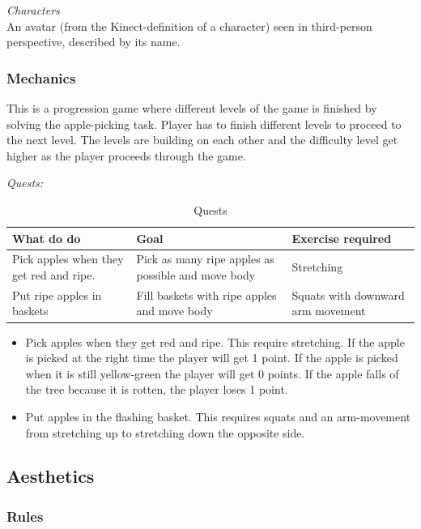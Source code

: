 \emph{Characters} \\
An avatar (from the Kinect-definition of a character) seen in third-person perspective, described by its name. 
 
\subsubsection{Mechanics} 
This is a progression game where different levels of the game is finished by solving the apple-picking task. Player has to finish different levels to proceed to the next level. The levels are building on each other and the difficulty level get higher as the player proceeds through the game.

\emph{Quests:} 

\begin{table}
     \begin{tabular}{|>{\raggedright}p{}|>{\raggedright}p{5cm}|p{}|}
       \hline
        \textbf{What do do} & \textbf{Goal} & \textbf{Exercise required}  \\ \hline
       Pick apples when they get red and ripe. & Pick as many ripe apples as possible and move body & Stretching  \\ \hline
       Put ripe apples in baskets & Fill baskets with ripe apples and move body &  Squats with downward arm movement \\ \hline
      \end{tabular}
      \caption[Quests in the "Apple Picking" game]{Quests}
    \label{tab:quests2}
 \end{table}

\begin{itemize}
\item Pick apples when they get red and ripe. This require stretching. If the apple is picked at the right time the player will get 1 point. If the apple is picked when it is still yellow-green the player will get 0 points. If the apple falls of the tree because it is rotten, the player loses 1 point. 
\item Put apples in the flashing basket. This requires squats and an arm-movement from stretching up to stretching down the opposite side.
\end{itemize}

\subsection{Aesthetics}

\subsubsection{Rules} 

